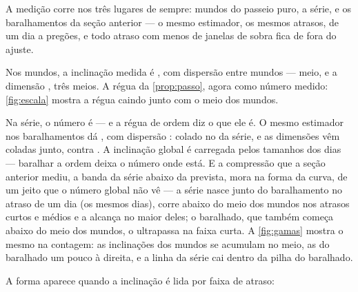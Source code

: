 A medição corre nos três lugares de sempre: \numExpoenteMundos{} mundos do passeio puro, a
série, e os \numExpoenteSorteios{} baralhamentos da seção anterior --- o mesmo estimador,
os mesmos \numExpoenteAtrasos{} atrasos, de um dia a \numExpoenteAtrasoMaximo{} pregões, e
todo atraso com menos de \numExpoenteJanelasMinimas{} janelas de sobra fica de fora do
ajuste.

Nos mundos, a inclinação medida é \numExpoenteGammaPasseio{}, com dispersão
\numExpoenteGammaPasseioDispersao{} entre mundos --- meio, e a dimensão
\numExpoenteDimensaoPasseio{}, três meios. A régua da \cref{prop:passo}, agora como número
medido: \cref{fig:escala} mostra a régua caindo junto com o meio dos mundos.

Na série, o número é \numExpoenteGammaReal{} --- e a régua de ordem diz o que ele é. O
mesmo estimador nos baralhamentos dá \numExpoenteGammaBaralhadoMedia{}, com dispersão
\numExpoenteGammaBaralhadoDispersao{}: colado no da série, e as dimensões vêm coladas
junto, \numExpoenteDimensaoReal{} contra \numExpoenteDimensaoBaralhadoMedia{}. A inclinação global é carregada pelos tamanhos dos dias --- baralhar a ordem deixa o
número onde está. E a compressão que a
seção anterior mediu, a banda da série abaixo da prevista, mora na forma da curva, de um
jeito que o número global não vê --- a série nasce junto do baralhamento no atraso de um dia
(os mesmos dias), corre abaixo do meio dos mundos nos atrasos curtos e médios e a
alcança no maior deles; o baralhado, que também começa abaixo do meio dos mundos, o ultrapassa
na faixa curta. A \cref{fig:gamas} mostra o mesmo na contagem: as inclinações dos mundos se
acumulam no meio, as do baralhado um pouco à direita, e a linha da série cai dentro da
pilha do baralhado.

A forma aparece quando a inclinação é lida por faixa de atraso:

\begin{table}[htbp]
  \centering
  \small
  \caption{O expoente do caminho lido por faixa de atraso. Nos mundos, meio em toda faixa;
    na série, a inclinação anda com a escala; no baralhado, bem mais parada.}
  \label{tab:faixas}
\end{table}

